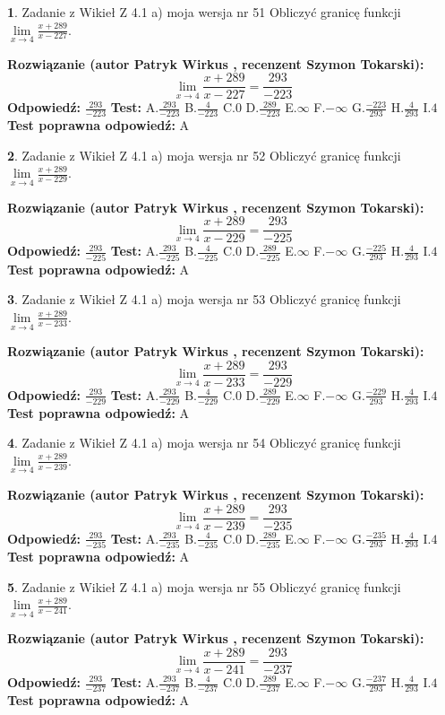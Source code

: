\documentclass[12pt, a4paper]{article}
\theoremstyle{definition} %
\newtheorem{zad}{}
\newcommand{\zadStart}[1]{\begin{zad}#1\newline}
\newcommand{\zadStop}{\end{zad}}
\newcommand{\rozwStart}[2]{\noindent \textbf{Rozwiązanie (autor #1 , recenzent #2): }\newline}
\newcommand{\rozwStop}{\newline}
\newcommand{\odpStart}{\noindent \textbf{Odpowiedź:}\newline}
\newcommand{\odpStop}{\newline}
\newcommand{\testStart}{\noindent \textbf{Test:}\newline}
\newcommand{\testStop}{\newline}
\newcommand{\kluczStart}{\noindent \textbf{Test poprawna odpowiedź:}\newline}
\newcommand{\kluczStop}{\newline}
\begin{document}
\zadStart{Zadanie z Wikieł Z 4.1 a) moja wersja nr 51}
Obliczyć granicę funkcji $\lim\limits_{x\to4}\frac{x+289}{x-227}$.
\zadStop
\rozwStart{Patryk Wirkus}{Szymon Tokarski}
$$\lim\limits_{x\to4}\frac{x+289}{x-227} = \frac{293}{-223}$$
\rozwStop
\odpStart
$\frac{293}{-223}$
\odpStop
\testStart
A.$\frac{293}{-223}$
B.$\frac{4}{-223}$
C.$0$
D.$\frac{289}{-223}$
E.$\infty$
F.$-\infty$
G.$\frac{-223}{293}$
H.$\frac{4}{293}$
I.$4$
\testStop
\kluczStart
A
\kluczStop



\zadStart{Zadanie z Wikieł Z 4.1 a) moja wersja nr 52}
Obliczyć granicę funkcji $\lim\limits_{x\to4}\frac{x+289}{x-229}$.
\zadStop
\rozwStart{Patryk Wirkus}{Szymon Tokarski}
$$\lim\limits_{x\to4}\frac{x+289}{x-229} = \frac{293}{-225}$$
\rozwStop
\odpStart
$\frac{293}{-225}$
\odpStop
\testStart
A.$\frac{293}{-225}$
B.$\frac{4}{-225}$
C.$0$
D.$\frac{289}{-225}$
E.$\infty$
F.$-\infty$
G.$\frac{-225}{293}$
H.$\frac{4}{293}$
I.$4$
\testStop
\kluczStart
A
\kluczStop



\zadStart{Zadanie z Wikieł Z 4.1 a) moja wersja nr 53}
Obliczyć granicę funkcji $\lim\limits_{x\to4}\frac{x+289}{x-233}$.
\zadStop
\rozwStart{Patryk Wirkus}{Szymon Tokarski}
$$\lim\limits_{x\to4}\frac{x+289}{x-233} = \frac{293}{-229}$$
\rozwStop
\odpStart
$\frac{293}{-229}$
\odpStop
\testStart
A.$\frac{293}{-229}$
B.$\frac{4}{-229}$
C.$0$
D.$\frac{289}{-229}$
E.$\infty$
F.$-\infty$
G.$\frac{-229}{293}$
H.$\frac{4}{293}$
I.$4$
\testStop
\kluczStart
A
\kluczStop



\zadStart{Zadanie z Wikieł Z 4.1 a) moja wersja nr 54}
Obliczyć granicę funkcji $\lim\limits_{x\to4}\frac{x+289}{x-239}$.
\zadStop
\rozwStart{Patryk Wirkus}{Szymon Tokarski}
$$\lim\limits_{x\to4}\frac{x+289}{x-239} = \frac{293}{-235}$$
\rozwStop
\odpStart
$\frac{293}{-235}$
\odpStop
\testStart
A.$\frac{293}{-235}$
B.$\frac{4}{-235}$
C.$0$
D.$\frac{289}{-235}$
E.$\infty$
F.$-\infty$
G.$\frac{-235}{293}$
H.$\frac{4}{293}$
I.$4$
\testStop
\kluczStart
A
\kluczStop



\zadStart{Zadanie z Wikieł Z 4.1 a) moja wersja nr 55}
Obliczyć granicę funkcji $\lim\limits_{x\to4}\frac{x+289}{x-241}$.
\zadStop
\rozwStart{Patryk Wirkus}{Szymon Tokarski}
$$\lim\limits_{x\to4}\frac{x+289}{x-241} = \frac{293}{-237}$$
\rozwStop
\odpStart
$\frac{293}{-237}$
\odpStop
\testStart
A.$\frac{293}{-237}$
B.$\frac{4}{-237}$
C.$0$
D.$\frac{289}{-237}$
E.$\infty$
F.$-\infty$
G.$\frac{-237}{293}$
H.$\frac{4}{293}$
I.$4$
\testStop
\kluczStart
A
\kluczStop
\end{document}
